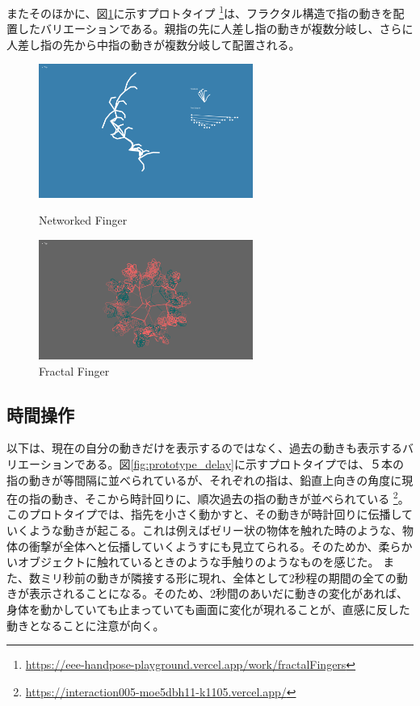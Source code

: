またそのほかに、図\ref{fig:fractal_finger}に示すプロトタイプ \footnote{\url{https://eee-handpose-playground.vercel.app/work/fractalFingers}}は、フラクタル構造で指の動きを配置したバリエーションである。親指の先に人差し指の動きが複数分岐し、さらに人差し指の先から中指の動きが複数分岐して配置される。

\begin{figure}[htbp]
  \begin{minipage}[b]{0.5\linewidth}
    \centering
    \includegraphics[keepaspectratio, width=7cm]{img/networked_finger.png}
    \caption{Networked Finger}
    \label{fig:networked_finger}
  \end{minipage}
  \begin{minipage}[b]{0.5\linewidth}
    \centering
    \includegraphics[keepaspectratio, width=7cm]{img/fractel_finger.png}
    \caption{Fractal Finger}
    \label{fig:fractal_finger}
  \end{minipage}
\end{figure}

\subsection{時間操作}
以下は、現在の自分の動きだけを表示するのではなく、過去の動きも表示するバリエーションである。図\ref{fig:prototype_delay}に示すプロトタイプでは、５本の指の動きが等間隔に並べられているが、それぞれの指は、鉛直上向きの角度に現在の指の動き、そこから時計回りに、順次過去の指の動きが並べられている \footnote{\url{https://interaction005-moe5dbh11-k1105.vercel.app/}}。このプロトタイプでは、指先を小さく動かすと、その動きが時計回りに伝播していくような動きが起こる。これは例えばゼリー状の物体を触れた時のような、物体の衝撃が全体へと伝播していくようすにも見立てられる。そのためか、柔らかいオブジェクトに触れているときのような手触りのようなものを感じた。
また、数ミリ秒前の動きが隣接する形に現れ、全体として2秒程の期間の全ての動きが表示されることになる。そのため、2秒間のあいだに動きの変化があれば、身体を動かしていても止まっていても画面に変化が現れることが、直感に反した動きとなることに注意が向く。

